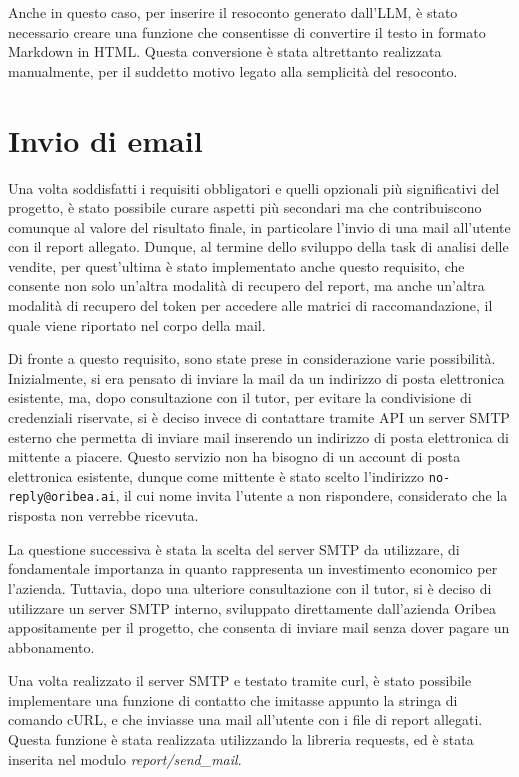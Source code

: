 Anche in questo caso, per inserire il resoconto generato dall'LLM, è stato necessario creare una funzione che consentisse di convertire il testo in formato Markdown in HTML. Questa conversione è stata altrettanto realizzata manualmente, per il suddetto motivo legato alla semplicità del resoconto.


\section{Invio di email}

Una volta soddisfatti i requisiti obbligatori e quelli opzionali più significativi del progetto, è stato possibile curare aspetti più secondari ma che contribuiscono comunque al valore del risultato finale, in particolare l'invio di una mail all'utente con il report allegato. Dunque, al termine dello sviluppo della task di analisi delle vendite, per quest'ultima è stato implementato anche questo requisito, che consente non solo un'altra modalità di recupero del report, ma anche un'altra modalità di recupero del token per accedere alle matrici di raccomandazione, il quale viene riportato nel corpo della mail.

Di fronte a questo requisito, sono state prese in considerazione varie possibilità.
Inizialmente, si era pensato di inviare la mail da un indirizzo di posta elettronica esistente, ma, dopo consultazione con il tutor, per evitare la condivisione di credenziali riservate, si è deciso invece di contattare tramite API un server SMTP esterno che permetta di inviare mail inserendo un indirizzo di posta elettronica di mittente a piacere. Questo servizio non ha bisogno di un account di posta elettronica esistente, dunque come mittente è stato scelto l'indirizzo \texttt{no-reply@oribea.ai}, il cui nome invita l'utente a non rispondere, considerato che la risposta non verrebbe ricevuta.

La questione successiva è stata la scelta del server SMTP da utilizzare, di fondamentale importanza in quanto rappresenta un investimento economico per l'azienda.
Tuttavia, dopo una ulteriore consultazione con il tutor, si è deciso di utilizzare un server SMTP interno, sviluppato direttamente dall'azienda Oribea appositamente per il progetto, che consenta di inviare mail senza dover pagare un abbonamento.

Una volta realizzato il server SMTP e testato tramite \gls{curl}, è stato possibile implementare una funzione di contatto che imitasse appunto la stringa di comando cURL, e che inviasse una mail all'utente con i file di report allegati. Questa funzione è stata realizzata utilizzando la libreria \gls{requests}, ed è stata inserita nel modulo \emph{report/send\_mail}.

